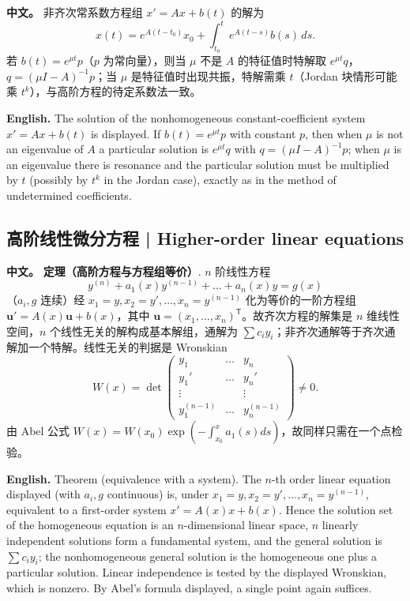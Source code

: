 \documentclass[UTF8,11pt,a4paper]{ctexart}
\newcommand{\APS}[2]{\par\noindent\textbf{中文。} #1\par\noindent\textbf{English.} #2\par}
\begin{document}
\APS{非齐次常系数方程组 $x'=Ax+b(t)$ 的解为
\[
x(t)=e^{A(t-t_0)}x_0+\int_{t_0}^{t}e^{A(t-s)}b(s)\,ds .
\]
若 $b(t)=e^{\mu t}p$（$p$ 为常向量），则当 $\mu$ 不是 $A$ 的特征值时特解取 $e^{\mu t}q$，$q=(\mu I-A)^{-1}p$；当 $\mu$ 是特征值时出现共振，特解需乘 $t$（Jordan 块情形可能乘 $t^k$），与高阶方程的待定系数法一致。}{The solution of the nonhomogeneous constant-coefficient system $x'=Ax+b(t)$ is displayed. If $b(t)=e^{\mu t}p$ with constant $p$, then when $\mu$ is not an eigenvalue of $A$ a particular solution is $e^{\mu t}q$ with $q=(\mu I-A)^{-1}p$; when $\mu$ is an eigenvalue there is resonance and the particular solution must be multiplied by $t$ (possibly by $t^k$ in the Jordan case), exactly as in the method of undetermined coefficients.}
\subsection{高阶线性微分方程 | Higher-order linear equations}
\APS{\textbf{定理（高阶方程与方程组等价）}. $n$ 阶线性方程
\[
y^{(n)}+a_1(x)y^{(n-1)}+\dots+a_n(x)y=g(x)
\]
（$a_i,g$ 连续）经 $x_1=y,x_2=y',\dots,x_n=y^{(n-1)}$ 化为等价的一阶方程组 $\mathbf u'=A(x)\mathbf u+b(x)$，其中 $\mathbf u=(x_1,\ldots,x_n)^{\mathsf T}$。故齐次方程的解集是 $n$ 维线性空间，$n$ 个线性无关的解构成基本解组，通解为 $\sum c_iy_i$；非齐次通解等于齐次通解加一个特解。线性无关的判据是 Wronskian
\[
W(x)=\det\begin{pmatrix}
y_1&\dots&y_n\\
y_1'&\dots&y_n'\\
\vdots&&\vdots\\
y_1^{(n-1)}&\dots&y_n^{(n-1)}
\end{pmatrix}\ne0 .
\]
由 Abel 公式 $W(x)=W(x_0)\exp\left(-\int_{x_0}^{x}a_1(s)ds\right)$，故同样只需在一个点检验。}{Theorem (equivalence with a system). The $n$-th order linear equation displayed (with $a_i,g$ continuous) is, under $x_1=y,x_2=y',\dots,x_n=y^{(n-1)}$, equivalent to a first-order system $x'=A(x)x+b(x)$. Hence the solution set of the homogeneous equation is an $n$-dimensional linear space, $n$ linearly independent solutions form a fundamental system, and the general solution is $\sum c_iy_i$; the nonhomogeneous general solution is the homogeneous one plus a particular solution. Linear independence is tested by the displayed Wronskian, which is nonzero. By Abel's formula displayed, a single point again suffices.}
\end{document}
